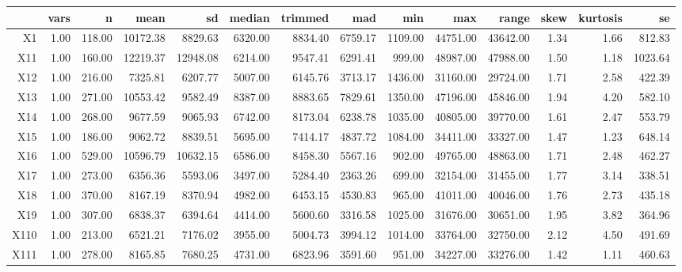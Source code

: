 \begin{tabular}{rrrrrrrrrrrrrr}
  \hline
 & vars & n & mean & sd & median & trimmed & mad & min & max & range & skew & kurtosis & se \\ 
  \hline
X1 & 1.00 & 118.00 & 10172.38 & 8829.63 & 6320.00 & 8834.40 & 6759.17 & 1109.00 & 44751.00 & 43642.00 & 1.34 & 1.66 & 812.83 \\ 
  X11 & 1.00 & 160.00 & 12219.37 & 12948.08 & 6214.00 & 9547.41 & 6291.41 & 999.00 & 48987.00 & 47988.00 & 1.50 & 1.18 & 1023.64 \\ 
  X12 & 1.00 & 216.00 & 7325.81 & 6207.77 & 5007.00 & 6145.76 & 3713.17 & 1436.00 & 31160.00 & 29724.00 & 1.71 & 2.58 & 422.39 \\ 
  X13 & 1.00 & 271.00 & 10553.42 & 9582.49 & 8387.00 & 8883.65 & 7829.61 & 1350.00 & 47196.00 & 45846.00 & 1.94 & 4.20 & 582.10 \\ 
  X14 & 1.00 & 268.00 & 9677.59 & 9065.93 & 6742.00 & 8173.04 & 6238.78 & 1035.00 & 40805.00 & 39770.00 & 1.61 & 2.47 & 553.79 \\ 
  X15 & 1.00 & 186.00 & 9062.72 & 8839.51 & 5695.00 & 7414.17 & 4837.72 & 1084.00 & 34411.00 & 33327.00 & 1.47 & 1.23 & 648.14 \\ 
  X16 & 1.00 & 529.00 & 10596.79 & 10632.15 & 6586.00 & 8458.30 & 5567.16 & 902.00 & 49765.00 & 48863.00 & 1.71 & 2.48 & 462.27 \\ 
  X17 & 1.00 & 273.00 & 6356.36 & 5593.06 & 3497.00 & 5284.40 & 2363.26 & 699.00 & 32154.00 & 31455.00 & 1.77 & 3.14 & 338.51 \\ 
  X18 & 1.00 & 370.00 & 8167.19 & 8370.94 & 4982.00 & 6453.15 & 4530.83 & 965.00 & 41011.00 & 40046.00 & 1.76 & 2.73 & 435.18 \\ 
  X19 & 1.00 & 307.00 & 6838.37 & 6394.64 & 4414.00 & 5600.60 & 3316.58 & 1025.00 & 31676.00 & 30651.00 & 1.95 & 3.82 & 364.96 \\ 
  X110 & 1.00 & 213.00 & 6521.21 & 7176.02 & 3955.00 & 5004.73 & 3994.12 & 1014.00 & 33764.00 & 32750.00 & 2.12 & 4.50 & 491.69 \\ 
  X111 & 1.00 & 278.00 & 8165.85 & 7680.25 & 4731.00 & 6823.96 & 3591.60 & 951.00 & 34227.00 & 33276.00 & 1.42 & 1.11 & 460.63 \\ 
   \hline
\end{tabular}


